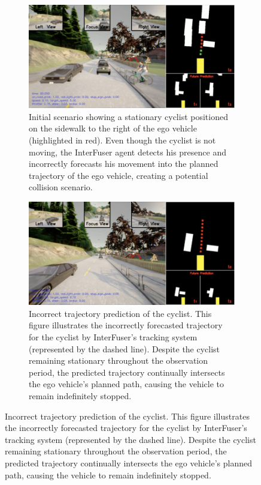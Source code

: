 \begin{figure}[htbp]
    \centering
    \begin{subfigure}[b]{0.45\textwidth}
        \centering
        \includegraphics[width=\columnwidth]{images/RS01_R0_bikeRight.png}
        \caption{Initial scenario showing a stationary cyclist positioned on the sidewalk to the right of the ego vehicle (highlighted in red). Even though the cyclist is not moving, the InterFuser agent detects his presence and incorrectly forecasts his movement into the planned trajectory of the ego vehicle, creating a potential collision scenario.}
        \label{fig:RS01_initial_bike_right}
    \end{subfigure}
    \hfill
    \begin{subfigure}[b]{0.45\textwidth}
        \centering
        \includegraphics[width=\columnwidth]{images/RS01_R0_wrongPredBike.png}
        \caption{Incorrect trajectory prediction of the cyclist. This figure illustrates the incorrectly forecasted trajectory for the cyclist by InterFuser's tracking system (represented by the dashed line). Despite the cyclist remaining stationary throughout the observation period, the predicted trajectory continually intersects the ego vehicle's planned path, causing the vehicle to remain indefinitely stopped.}

\end{subfigure}
\end{figure}
